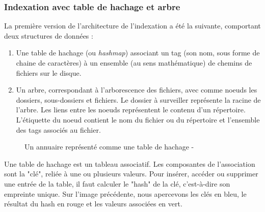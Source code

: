 \documentclass[a4paper, 12pt]{article}
\begin{document}
\subsubsection{Indexation avec table de hachage et arbre}\label{indexation_hashmap_arbre}
La première version de l'architecture de l'indexation a été la suivante, comportant deux structures 
de données :
\begin{enumerate}
    \item Une table de hachage (ou \textit{hashmap}) associant un tag (son nom, sous forme de 
        chaine de caractères) à un ensemble (au sens mathématique) de chemins de fichiers sur 
        le disque.
    \item Un arbre, correspondant à l'arborescence des fichiers, avec comme noeuds les dossiers, 
        sous-dossiers et fichiers. Le dossier à surveiller représente la racine de l'arbre.
        Les liens entre les noeuds représentent le contenu d'un répertoire. L'étiquette du noeud 
        contient le nom du fichier ou du répertoire et l'ensemble des tags associés au fichier.
\end{enumerate}
\begin{figure}
    \begin{center}
    \end{center}
    \caption{Un annuaire représenté comme une table de hachage - \cite{ref27}}
\end{figure}
Une table de hachage est un tableau associatif. Les composantes de l'association sont la "clé", 
reliée à une ou plusieurs valeurs. Pour insérer, accéder ou supprimer une entrée de la table, 
il faut calculer le "hash" de la clé, c'est-à-dire son empreinte unique. Sur l'image précédente, 
nous apercevons les clés en bleu, le résultat du hash en rouge et les valeurs associées en vert. 
\end{document}

